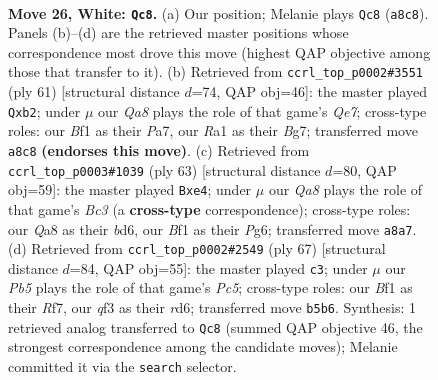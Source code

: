 \documentclass[11pt]{article}
\begin{document}
\begin{figure}[p]\centering
\begin{subfigure}{0.46\textwidth}\centering
\resizebox{\linewidth}{!}{%
\newchessgame
\chessboard[
  setfen={Q7/pp1n2kp/7p/1P4b1/3P2P1/3r1q2/4N3/R3KB1R w - - 0 26},
  showmover=false,
  pgfstyle=straightmove, color=movearrow, markmove={a8-c8}
]}
\caption{}
\end{subfigure}\hfill
\begin{subfigure}{0.46\textwidth}\centering
\resizebox{\linewidth}{!}{%
\newchessgame
\chessboard[
  setfen={5r1k/p5bp/6p1/p1Q5/7P/2P3P1/1P2qPB1/R5K1 b - - 2 31},
  showmover=false,
  pgfstyle=straightmove, color=movearrow, markmove={e2-b2}
]}
\caption{}
\end{subfigure}
\\[4pt]
\begin{subfigure}{0.46\textwidth}\centering
\resizebox{\linewidth}{!}{%
\newchessgame
\chessboard[
  setfen={4r1k1/8/2bB1Pp1/2p3n1/2R1P1q1/1PP5/3Q1KB1/8 b - - 4 32},
  showmover=false,
  pgfstyle=straightmove, color=movearrow, markmove={c6-e4}
]}
\caption{}
\end{subfigure}\hfill
\begin{subfigure}{0.46\textwidth}\centering
\resizebox{\linewidth}{!}{%
\newchessgame
\chessboard[
  setfen={3q4/3P1r1k/p2R1n2/4Q3/1pp5/7P/PP3PP1/6K1 b - - 4 34},
  showmover=false,
  pgfstyle=straightmove, color=movearrow, markmove={c4-c3}
]}
\caption{}
\end{subfigure}
\caption{\textbf{Move 26, White: \texttt{Qc8}.} (a) Our position; Melanie plays \texttt{Qc8} (\texttt{a8c8}). Panels (b)--(d) are the retrieved master positions whose correspondence most drove this move (highest QAP objective among those that transfer to it). (b) Retrieved from \texttt{ccrl\_top\_p0002\#3551} (ply 61) [structural distance $d$=74, QAP obj=46]: the master played \texttt{Qxb2}; under $\mu$ our \emph{Qa8} plays the role of that game's \emph{Qe7}; cross-type roles: our \emph{B}f1 as their \emph{P}a7, our \emph{R}a1 as their \emph{B}g7; transferred move \texttt{a8c8} \textbf{(endorses this move)}. (c) Retrieved from \texttt{ccrl\_top\_p0003\#1039} (ply 63) [structural distance $d$=80, QAP obj=59]: the master played \texttt{Bxe4}; under $\mu$ our \emph{Qa8} plays the role of that game's \emph{Bc3} (a \textbf{cross-type} correspondence); cross-type roles: our \emph{Q}a8 as their \emph{b}d6, our \emph{B}f1 as their \emph{P}g6; transferred move \texttt{a8a7}. (d) Retrieved from \texttt{ccrl\_top\_p0002\#2549} (ply 67) [structural distance $d$=84, QAP obj=55]: the master played \texttt{c3}; under $\mu$ our \emph{Pb5} plays the role of that game's \emph{Pc5}; cross-type roles: our \emph{B}f1 as their \emph{R}f7, our \emph{q}f3 as their \emph{r}d6; transferred move \texttt{b5b6}. Synthesis: 1 retrieved analog transferred to \texttt{Qc8} (summed QAP objective 46, the strongest correspondence among the candidate moves); Melanie committed it via the \texttt{search} selector.}
\label{fig:thought-m50}
\end{figure}
\end{document}
